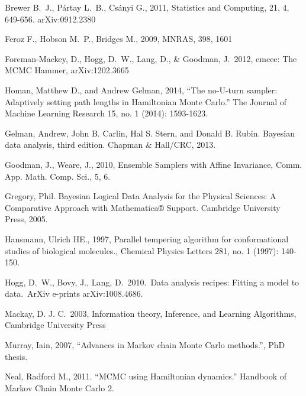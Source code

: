 \begin{thebibliography}{999}
 Brewer B.~J., P{\'a}rtay L.~B., Cs{\'a}nyi G., 2011,
Statistics and Computing, 21, 4, 649-656. arXiv:0912.2380

 Feroz F., Hobson M.~P., Bridges M., 2009, MNRAS, 398, 1601

 Foreman-Mackey, 
D., Hogg, D.~W., Lang, D., \& Goodman, J.\ 2012, emcee: The MCMC Hammer, arXiv:1202.3665 

Homan, Matthew D., and Andrew Gelman, 2014, ``The no-U-turn sampler: Adaptively setting path lengths in Hamiltonian Monte Carlo.'' The Journal of Machine Learning Research 15, no. 1 (2014): 1593-1623.

Gelman, Andrew, John B. Carlin, Hal S. Stern, and Donald B. Rubin. Bayesian data analysis, third edition. Chapman \& Hall/CRC, 2013.

Goodman, J., Weare, J., 2010, Ensemble Samplers with Affine Invariance, Comm. App. Math. Comp. Sci., 5, 6.

Gregory, Phil. Bayesian Logical Data Analysis for the Physical Sciences: A Comparative Approach with Mathematica® Support. Cambridge University Press, 2005.

 Hansmann, Ulrich HE.,
1997, Parallel tempering algorithm for conformational studies of biological
molecules., Chemical Physics Letters 281, no. 1 (1997): 140-150.

 Hogg, D.~W., Bovy, J., 
Lang, D.\ 2010.\ Data analysis recipes: Fitting a model to data.\ ArXiv 
e-prints arXiv:1008.4686. 

 Mackay,
D. J. C.\ 2003, Information theory, Inference, and Learning
Algorithms, Cambridge University Press

Murray, Iain, 2007, ``Advances in Markov chain Monte Carlo methods.'',
PhD thesis.

Neal, Radford M., 2011. ``MCMC using Hamiltonian dynamics.''
Handbook of Markov Chain Monte Carlo 2.


\end{thebibliography}
